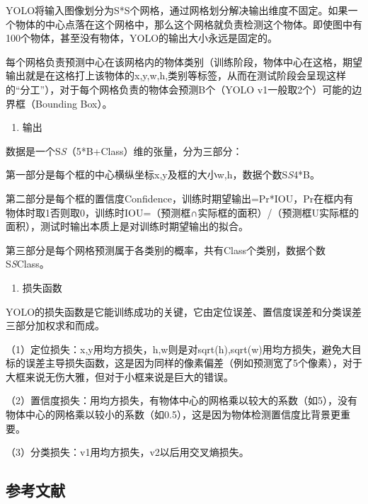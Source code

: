 YOLO将输入图像划分为S*S个网格，通过网格划分解决输出维度不固定。如果一个物体的中心点落在这个网格中，那么这个网格就负责检测这个物体。即使图中有100个物体，甚至没有物体，YOLO的输出大小永远是固定的。

每个网格负责预测中心在该网格内的物体类别（训练阶段，物体中心在这格，期望输出就是在这格打上该物体的x,y,w,h,类别等标签，从而在测试阶段会呈现这样的``分工''），对于每个网格负责的物体会预测B个（YOLO v1一般取2个）可能的边界框（Bounding Box）。

\begin{enumerate}
\def\labelenumi{\arabic{enumi}.}
\setcounter{enumi}{1}
\tightlist
\item
  输出
\end{enumerate}

数据是一个S\emph{S}（5*B+Class）维的张量，分为三部分：

第一部分是每个框的中心横纵坐标x,y及框的大小w,h，数据个数S\emph{S}4*B。

第二部分是每个框的置信度Confidence，训练时期望输出=Pr*IOU，Pr在框内有物体时取1否则取0，训练时IOU=（预测框∩实际框的面积）/（预测框U实际框的面积），测试时输出本质上是对训练时期望输出的拟合。

第三部分是每个网格预测属于各类别的概率，共有Class个类别，数据个数S\emph{S}Class。

\begin{enumerate}
\def\labelenumi{\arabic{enumi}.}
\setcounter{enumi}{2}
\tightlist
\item
  损失函数
\end{enumerate}

YOLO的损失函数是它能训练成功的关键，它由定位误差、置信度误差和分类误差三部分加权求和而成。

（1）定位损失：x,y用均方损失，h,w则是对sqrt(h),sqrt(w)用均方损失，避免大目标的误差主导损失函数，这是因为同样的像素偏差（例如预测宽了5个像素），对于大框来说无伤大雅，但对于小框来说是巨大的错误。

（2）置信度损失：用均方损失，有物体中心的网格乘以较大的系数（如5），没有物体中心的网格乘以较小的系数（如0.5），这是因为物体检测置信度比背景更重要。

（3）分类损失：v1用均方损失，v2以后用交叉熵损失。

\FloatBarrier
{}
\hypertarget{ux53c2ux8003ux6587ux732e-16}{%
\subsection{参考文献}\label{ux53c2ux8003ux6587ux732e-16}}

